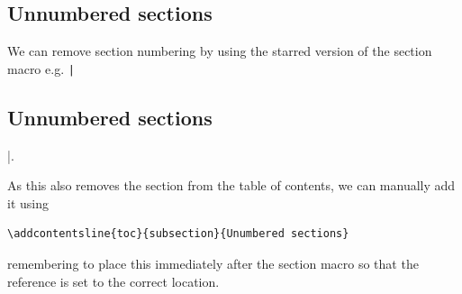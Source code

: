 \documentclass[11pt, twoside]{article}
\begin{document}
\subsection*{Unnumbered sections}
We can remove section numbering by using the starred version of the section macro
e.g. \linebreak \texttt|\subsection*{Unnumbered sections}|.

As this also removes the section from the table of contents, we can manually add it using
\begin{verbatim}
\addcontentsline{toc}{subsection}{Unumbered sections}
\end{verbatim}
remembering to place this immediately after the section macro so that the reference is set to the
correct location.
\end{document}
